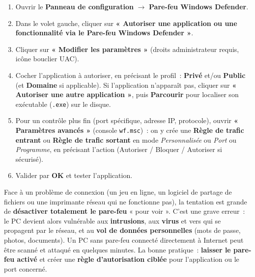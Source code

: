 \documentclass[11pt]{article}
\newcounter{popsec}
\newcounter{popsub}
\newcommand{\courssub}[1]{%
  \stepcounter{popsub}%
  \par\vspace{9pt}\noindent{\popxbold\fontsize{11.5}{13}\selectfont\color{popink}{\color{poporange}\thepopsec.\thepopsub}\hspace{6pt}#1}\par\nopagebreak\vspace{4pt}
}
\begin{document}
\begin{methode}
\begin{enumerate}
  \item Ouvrir le \textbf{Panneau de configuration} $\rightarrow$ \textbf{Pare-feu Windows Defender}.
  \item Dans le volet gauche, cliquer sur \textbf{« Autoriser une application ou une fonctionnalité via le Pare-feu Windows Defender »}.
  \item Cliquer sur \textbf{« Modifier les paramètres »} (droits administrateur requis, icône bouclier UAC).
  \item Cocher l'application à autoriser, en précisant le profil~: \textbf{Privé} et/ou \textbf{Public} (et \textbf{Domaine} si applicable). Si l'application n'apparaît pas, cliquer sur \textbf{« Autoriser une autre application »}, puis \textbf{Parcourir} pour localiser son exécutable (\texttt{.exe}) sur le disque.
  \item Pour un contrôle plus fin (port spécifique, adresse IP, protocole), ouvrir \textbf{« Paramètres avancés »} (console \texttt{wf.msc})~: on y crée une \textbf{Règle de trafic entrant} ou \textbf{Règle de trafic sortant} en mode \emph{Personnalisée} ou \emph{Port} ou \emph{Programme}, en précisant l'action (Autoriser / Bloquer / Autoriser si sécurisé).
  \item Valider par \textbf{OK} et tester l'application.
\end{enumerate}
\end{methode}

\begin{attention}
Face à un problème de connexion (un jeu en ligne, un logiciel de partage de fichiers ou une imprimante réseau qui ne fonctionne pas), la tentation est grande de \textbf{désactiver totalement le pare-feu} « pour voir ». C'est une grave erreur~: le PC devient alors vulnérable aux \textbf{intrusions}, aux \textbf{virus} et vers qui se propagent par le réseau, et au \textbf{vol de données personnelles} (mots de passe, photos, documents). Un PC sans pare-feu connecté directement à Internet peut être scanné et attaqué en quelques minutes. La bonne pratique~: \textbf{laisser le pare-feu activé} et créer une \textbf{règle d'autorisation ciblée} pour l'application ou le port concerné.
\end{attention}

\courssub{Les pilotes de périphériques}
\end{document}
